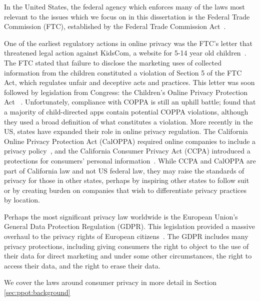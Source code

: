 In the United States, the federal agency which enforces many of the laws most relevant to the issues which we focus on in this dissertation is the Federal Trade Commission (FTC), established by the Federal Trade Commission Act~\cite{ftcact}.

One of the earliest regulatory actions in online privacy was the FTC's letter that threatened legal action against KidsCom, a website for 5-14 year old children~\cite{ftc1997principles}. The FTC stated that failure to disclose the marketing uses of collected information from the children constituted a violation of Section 5 of the FTC Act, which regulates unfair and deceptive acts and practices. This letter was soon followed by legislation from Congress: the Children's Online Privacy Protection Act ~\cite{coppa}. Unfortunately, compliance with COPPA is still an uphill battle; \citet{reyes2018won} found that a majority of child-directed apps contain potential COPPA violations, although they used a broad definition of what constitutes a violation. More recently in the US, states have expanded their role in online privacy regulation. The California Online Privacy Protection Act (CalOPPA) required online companies to include a privacy policy~\cite{caloppa}, and the California Consumer Privacy Act (CCPA) introduced a protections for consumers' personal information~\cite{ccpaANDcpra}. While CCPA and CalOPPA are part of California law and not US federal law, they may raise the standards of privacy for those in other states, perhaps by inspiring other states to follow suit or by creating burden on companies that wish to differentiate privacy practices by location.

Perhaps the most significant privacy law worldwide is the European Union's General Data Protection Regulation (GDPR). This legislation provided a massive overhaul to the privacy rights of European citizens~\cite{gdpr,hoofnagle2019european}. The GDPR includes many privacy protections, including giving consumers the right to object to the use of their data for direct marketing and under some other circumstances, the right to access their data, and the right to erase their data.

We cover the laws around consumer privacy in more detail in Section \ref{sec:ppot:background}





